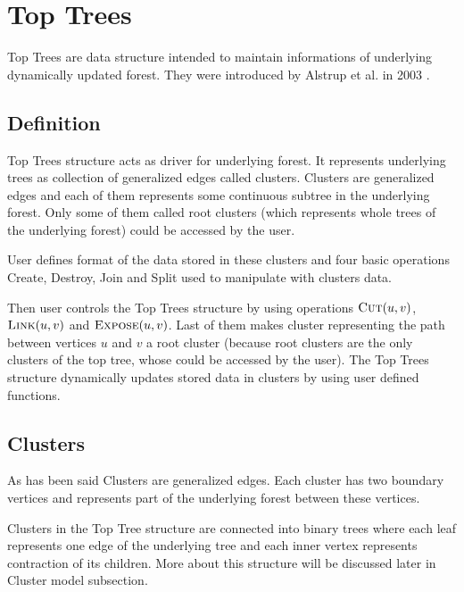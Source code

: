 \chapter{Top Trees}

Top Trees are data structure intended to maintain informations of underlying
dynamically updated forest. They were introduced by Alstrup et al. in 2003 \cite{TopTrees}.

\section{Definition}

{\I Top Trees structure} acts as driver for underlying forest. It represents
underlying trees as collection of generalized edges called {\I clusters}. {\I
Clusters} are generalized edges and each of them represents some continuous
subtree in the underlying forest. Only some of them called {\I root clusters}
(which represents whole trees of the underlying forest) could be accessed by the
user.

User defines format of the data stored in these clusters and four basic
operations {\sc Create}, {\sc Destroy}, {\sc Join} and {\sc Split} used to
manipulate with clusters data.

Then user controls the Top Trees structure by using operations $\hbox{\sc Cut}(u,v)$,
$\hbox{\sc Link}(u,v)$ and $\hbox{\sc Expose}(u,v)$. Last of them
makes cluster representing the path between vertices $u$ and $v$ a root cluster
(because root clusters are the only clusters of the top tree, whose could be
accessed by the user). The Top Trees structure dynamically updates stored data
in clusters by using user defined functions.




\section{Clusters}

As has been said {\I Clusters} are generalized edges. Each cluster has two
{\I boundary vertices} and represents part of the underlying forest between
these vertices.

Clusters in the Top Tree structure are connected into binary trees where each
leaf represents one edge of the underlying tree and each inner vertex represents
contraction of its children. More about this structure will be discussed
later in {\I Cluster model} subsection.

